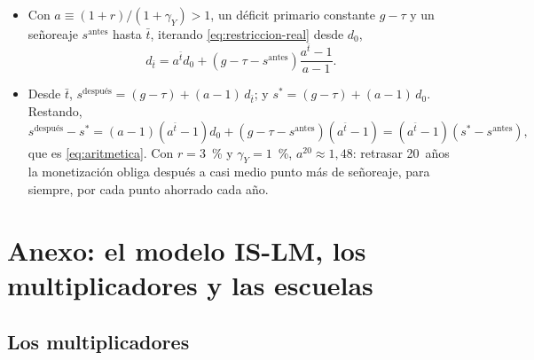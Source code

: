 \documentclass[11pt]{article}
\begin{document}
\begin{itemize}
\item Con $a\equiv(1+r)/(1+\gamma_Y)>1$, un déficit primario constante $g-\tau$ y un señoreaje $s^{\text{antes}}$ hasta $\bar t$, iterando \eqref{eq:restriccion-real} desde $d_0$,
  \begin{equation*}
  d_{\bar t}=a^{\bar t}d_0+\left(g-\tau-s^{\text{antes}}\right)\frac{a^{\bar t}-1}{a-1}.
  \end{equation*}
\item Desde $\bar t$, $s^{\text{después}}=(g-\tau)+(a-1)\,d_{\bar t}$; y $s^*=(g-\tau)+(a-1)\,d_0$. Restando,
  \begin{equation*}
  s^{\text{después}}-s^*=(a-1)\left(a^{\bar t}-1\right)d_0+\left(g-\tau-s^{\text{antes}}\right)\left(a^{\bar t}-1\right)=\left(a^{\bar t}-1\right)\left(s^*-s^{\text{antes}}\right),
  \end{equation*}
  que es \eqref{eq:aritmetica}. Con $r=3$~\% y $\gamma_Y=1$~\%, $a^{20}\approx1{,}48$: retrasar 20~años la monetización obliga después a casi medio punto más de señoreaje, para siempre, por cada punto ahorrado cada año.\findemo
\end{itemize}

\section{Anexo: el modelo IS-LM, los multiplicadores y las escuelas}\label{anexo:islm-escuelas}

\subsection{Los multiplicadores}
\end{document}
